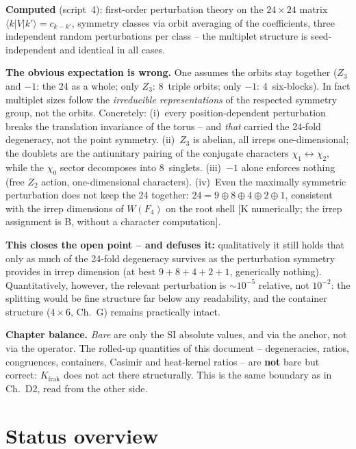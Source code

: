 \textbf{Computed} (script~4): first-order perturbation theory on
the $24\times24$ matrix $\langle k|V|k'\rangle = c_{k-k'}$,
symmetry classes via orbit averaging of the coefficients, three
independent random perturbations per class -- the multiplet
structure is seed-independent and identical in all cases.

\textbf{The obvious expectation is wrong.} One assumes the orbits
stay together ($Z_3$ and $-1$: the 24 as a whole; only $Z_3$:
8~triple orbits; only $-1$: 4~six-blocks). In fact multiplet sizes
follow the \emph{irreducible representations} of the respected
symmetry group, not the orbits. Concretely: (i)~every position-dependent
perturbation breaks the translation invariance of the torus --
and \emph{that} carried the 24-fold degeneracy, not the point
symmetry. (ii)~$Z_3$ is abelian, all irreps one-dimensional; the
doublets are the antiunitary pairing of the conjugate characters
$\chi_1\leftrightarrow\chi_2$, while the $\chi_0$ sector
decomposes into 8~singlets. (iii)~$-1$ alone enforces nothing
(free $Z_2$ action, one-dimensional characters). (iv)~Even the
maximally symmetric perturbation does not keep the 24 together:
$24 = 9\oplus8\oplus4\oplus2\oplus1$, consistent with the
irrep dimensions of $W(F_4)$ on the root shell [K numerically;
the irrep assignment is B, without a character computation].

\textbf{This closes the open point -- and defuses it:}
qualitatively it still holds that only as much of the 24-fold
degeneracy survives as the perturbation symmetry provides in irrep
dimension (at best $9+8+4+2+1$, generically nothing).
Quantitatively, however, the relevant perturbation is
$\sim10^{-5}$ relative, not $10^{-2}$: the splitting would be fine
structure far below any readability, and the container structure
($4\times6$, Ch.~G) remains practically intact.

\textbf{Chapter balance.} \emph{Bare} are only the SI absolute
values, and via the anchor, not via the operator. The rolled-up
quantities of this document -- degeneracies, ratios, congruences,
containers, Casimir and heat-kernel ratios -- are \textbf{not}
bare but correct: $K_\text{frak}$ does not act there
structurally. This is the same boundary as in Ch.~D2, read from
the other side.

\chapter{Status overview}

